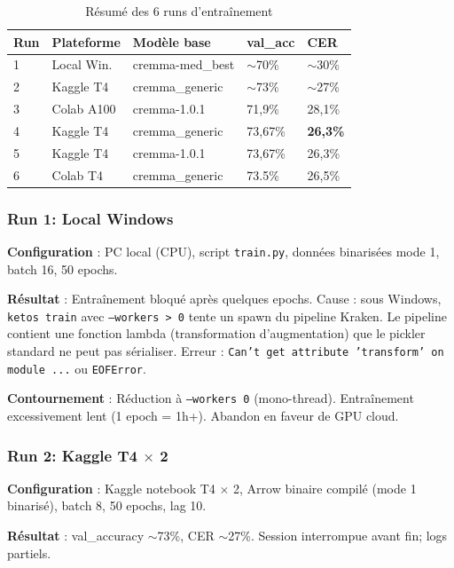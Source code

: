﻿\documentclass[twoside,twocolumn,10pt]{article}
\begin{document}
\begin{table}[!htbp]
\fontsize{10}{11}\selectfont
\centering
\caption{Résumé des 6 runs d'entraînement}
\begin{tabular}{C{0.3cm}L{1.8cm}C{2.4cm}C{0.9cm}C{0.9cm}}
\toprule
Run & Plateforme & Modèle base & val\_acc & CER \\
 & Local Win. & cremma-med\_best & $\sim$70\% & $\sim$30\% \\
2 & Kaggle T4 & cremma\_generic & $\sim$73\% & $\sim$27\% \\
3 & Colab A100 & cremma-1.0.1 & 71,9\% & 28,1\% \\
4 & Kaggle T4 & cremma\_generic & 73,67\% & \textbf{26,3\%} \\
5 & Kaggle T4 & cremma-1.0.1 & 73,67\% & 26,3\% \\
6 & Colab T4 & cremma\_generic & 73.5\% & 26,5\%\\

\bottomrule
\end{tabular}
\end{table}

\subsubsection{Run 1: Local Windows}

\textbf{Configuration} : PC local (CPU), script \texttt{train.py}, données binarisées mode 1, batch 16, 50 epochs.

\textbf{Résultat} : Entraînement bloqué après quelques epochs. Cause : sous Windows, \texttt{ketos train} avec \texttt{--workers > 0} tente un spawn du pipeline Kraken. Le pipeline contient une fonction lambda (transformation d'augmentation) que le pickler standard ne peut pas sérialiser. Erreur : \texttt{Can't get attribute 'transform' on module ...} ou \texttt{EOFError}.

\textbf{Contournement} : Réduction à \texttt{--workers 0} (mono-thread). Entraînement excessivement lent (1 epoch = 1h+). Abandon en faveur de GPU cloud.

\subsubsection{Run 2: Kaggle T4 $\times$ 2}

\textbf{Configuration} : Kaggle notebook T4 $\times$ 2, Arrow binaire compilé (mode 1 binarisé), batch 8, 50 epochs, lag 10.

\textbf{Résultat} : val\_accuracy $\sim$73\%, CER $\sim$27\%. Session interrompue avant fin; logs partiels.
\end{document}
